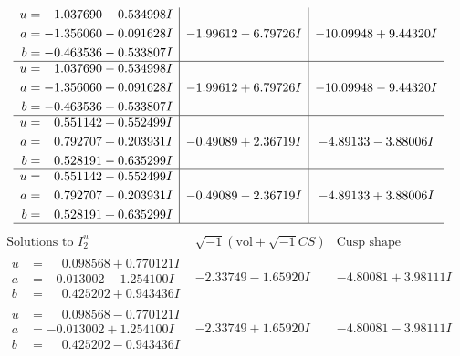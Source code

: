 \documentclass[1p]{elsarticle_modified}
\theoremstyle{definition}
\newcommand{\I}{\sqrt{-1}}
\begin{document}
$$\begin{array}{c|c|c}
\begin{aligned}
u &= \phantom{-}1.037690 + 0.534998 I \\
a &= -1.356060 - 0.091628 I \\
b &= -0.463536 - 0.533807 I\end{aligned}
 & -1.99612 - 6.79726 I & -10.09948 + 9.44320 I \\ \hline\begin{aligned}
u &= \phantom{-}1.037690 - 0.534998 I \\
a &= -1.356060 + 0.091628 I \\
b &= -0.463536 + 0.533807 I\end{aligned}
 & -1.99612 + 6.79726 I & -10.09948 - 9.44320 I \\ \hline\begin{aligned}
u &= \phantom{-}0.551142 + 0.552499 I \\
a &= \phantom{-}0.792707 + 0.203931 I \\
b &= \phantom{-}0.528191 - 0.635299 I\end{aligned}
 & -0.49089 + 2.36719 I & -4.89133 - 3.88006 I \\ \hline\begin{aligned}
u &= \phantom{-}0.551142 - 0.552499 I \\
a &= \phantom{-}0.792707 - 0.203931 I \\
b &= \phantom{-}0.528191 + 0.635299 I\end{aligned}
 & -0.49089 - 2.36719 I & -4.89133 + 3.88006 I\\
 \hline 
 \end{array}$$\newpage$$\begin{array}{c|c|c}  
\text{Solutions to }I^u_{2}& \I (\text{vol} + \sqrt{-1}CS) & \text{Cusp shape}\\
 \hline 
\begin{aligned}
u &= \phantom{-}0.098568 + 0.770121 I \\
a &= -0.013002 - 1.254100 I \\
b &= \phantom{-}0.425202 + 0.943436 I\end{aligned}
 & -2.33749 - 1.65920 I & -4.80081 + 3.98111 I \\ \hline\begin{aligned}
u &= \phantom{-}0.098568 - 0.770121 I \\
a &= -0.013002 + 1.254100 I \\
b &= \phantom{-}0.425202 - 0.943436 I\end{aligned}
 & -2.33749 + 1.65920 I & -4.80081 - 3.98111 I \\ \hline\begin{aligned}

\end{aligned}
\end{array}$$
\end{document}
